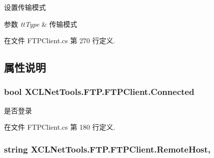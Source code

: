 设置传输模式 


\begin{DoxyParams}{参数}
{\em tt\+Type} & 传输模式\\
\hline
\end{DoxyParams}


在文件 F\+T\+P\+Client.\+cs 第 270 行定义.



\subsection{属性说明}
\subsubsection[{\texorpdfstring{Connected}{Connected}}]{\setlength{\rightskip}{0pt plus 5cm}bool X\+C\+L\+Net\+Tools.\+F\+T\+P.\+F\+T\+P\+Client.\+Connected\hspace{0.3cm}{\ttfamily [get]}}\hypertarget{class_x_c_l_net_tools_1_1_f_t_p_1_1_f_t_p_client_af3e0775ddf1dc1530b82b5b0a6aa4d25}{}\label{class_x_c_l_net_tools_1_1_f_t_p_1_1_f_t_p_client_af3e0775ddf1dc1530b82b5b0a6aa4d25}


是否登录 



在文件 F\+T\+P\+Client.\+cs 第 180 行定义.

\subsubsection[{\texorpdfstring{Remote\+Host}{RemoteHost}}]{\setlength{\rightskip}{0pt plus 5cm}string X\+C\+L\+Net\+Tools.\+F\+T\+P.\+F\+T\+P\+Client.\+Remote\+Host\hspace{0.3cm}{\ttfamily [get]}, {\ttfamily [set]}}\hypertarget{class_x_c_l_net_tools_1_1_f_t_p_1_1_f_t_p_client_a020891b3ab32deba2b8e2b2204349f1d}{}\label{class_x_c_l_net_tools_1_1_f_t_p_1_1_f_t_p_client_a020891b3ab32deba2b8e2b2204349f1d}


